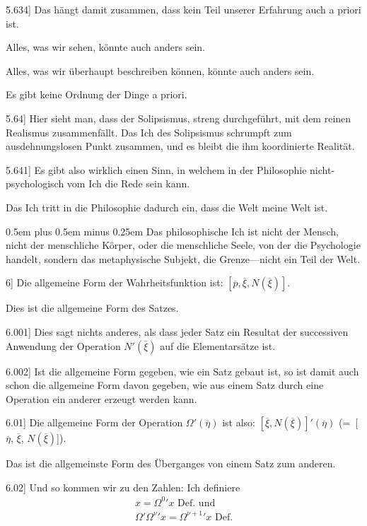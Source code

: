 \documentclass[12pt,oneside]{book}[2007/10/19]
\newcommand{\PropERef}[1]{\hyperref[PropE:#1]{#1}}
\newcommand{\PropositionG}[2]{%
  \item[\phantomsection\label{PropG:#1}\PropERef{#1}] #2%
}
\newcommand{\verystretchyspace}{\spaceskip0.5em plus 0.5em minus 0.25em}
\begin{document}
\begin{propositions}
\PropositionG{5.634}
{Das hängt damit zusammen, dass kein Teil
unserer Erfahrung auch a priori ist.

Alles, was wir sehen, könnte auch anders
sein.

Alles, was wir überhaupt beschreiben können,
könnte auch anders sein.

Es gibt keine Ordnung der Dinge a priori.}


\PropositionG{5.64}
{Hier sieht man, dass der Solipsismus, streng
durchgeführt, mit dem reinen Realismus zusammenfällt.
Das Ich des Solipsismus schrumpft zum
ausdehnungslosen Punkt zusammen, und es bleibt
die ihm koordinierte Realität.}


\PropositionG{5.641}
{Es gibt also wirklich einen Sinn, in welchem in
der Philosophie nicht-psy\-cho\-lo\-gisch vom Ich die
Rede sein kann.

Das Ich tritt in die Philosophie dadurch ein,
dass die \glqq{}Welt meine Welt ist\grqq{}.

{\verystretchyspace
Das philosophische Ich ist nicht der Mensch,
nicht der menschliche Körper, oder die menschliche
Seele, von der die Psychologie handelt, sondern das
metaphysische Subjekt, die Grenze---nicht ein Teil
der Welt.}}


\PropositionG{6}
{Die allgemeine Form der Wahrheitsfunktion ist:
$[\overline{p}, \overline{\xi}, N(\overline{\xi})]$.

Dies ist die allgemeine Form des Satzes.}


\PropositionG{6.001}
{Dies sagt nichts anderes, als dass jeder Satz ein
Resultat der successiven Anwendung der Operation
$N'(\overline{\xi})$ auf die Elementarsätze ist.}


\PropositionG{6.002}
{Ist die allgemeine Form gegeben, wie ein Satz
gebaut ist, so ist damit auch schon die allgemeine
Form davon gegeben, wie aus einem Satz durch
eine Operation ein anderer erzeugt werden
kann.}


\PropositionG{6.01}
{Die allgemeine Form der Operation $\Omega'(\overline{\eta})$ ist
also: $[\overline{\xi}, N(\overline{\xi})]'${}$(\overline{\eta})$ (=~[$\overline{\eta}$, $\overline{\xi}$, $N(\overline{\xi})$]).

Das ist die allgemeinste Form des Überganges
von einem Satz zum anderen.}


\PropositionG{6.02}
{Und so kommen wir zu den Zahlen: Ich definiere
\begin{gather*}
x = \Omega^{0}{}' x \text{ Def.\ und}\\
\Omega'\Omega^{\nu}{}'x = \Omega^{\nu+1}{}'x \text{ Def.}
\end{gather*}

}
\end{propositions}
\end{document}
